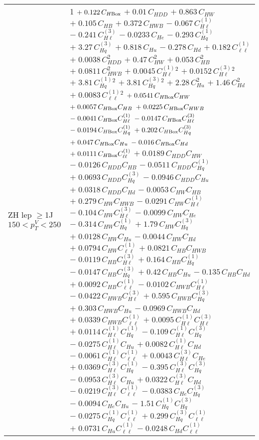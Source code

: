 \begin{tabular}{l|p{}}
    ZH lep $\geq$1J $150 < p_{T}^{V} < 250$ & 1 $+\;0.122\,C_{H\rm{Box}}$ $+\;0.01\,C_{HDD}$ $+\;0.863\,C_{HW}$ $+\;0.105\,C_{HB}$ $+\;0.372\,C_{HWB}$ $-\;0.067\,C^{(1)}_{H\ell}$ $-\;0.241\,C^{(3)}_{H\ell}$ $-\;0.0233\,C_{He}$ $-\;0.293\,C^{(1)}_{Hq}$ $+\;3.27\,C^{(3)}_{Hq}$ $+\;0.818\,C_{Hu}$ $-\;0.278\,C_{Hd}$ $+\;0.182\,C^{(1)}_{\ell\ell}$ $+\;0.0038\,C_{HDD}^{2}$ $+\;0.47\,C_{HW}^{2}$ $+\;0.053\,C_{HB}^{2}$ $+\;0.0811\,C_{HWB}^{2}$ $+\;0.0045\,C^{(1)}_{H\ell}^{2}$ $+\;0.0152\,C^{(3)}_{H\ell}^{2}$ $+\;3.81\,C^{(1)}_{Hq}^{2}$ $+\;3.81\,C^{(3)}_{Hq}^{2}$ $+\;2.28\,C_{Hu}^{2}$ $+\;1.46\,C_{Hd}^{2}$ $+\;0.0083\,C^{(1)}_{\ell\ell}^{2}$ $+\;0.0541\,C_{H\rm{Box}}C_{HW}$ $+\;0.0057\,C_{H\rm{Box}}C_{HB}$ $+\;0.0225\,C_{H\rm{Box}}C_{HWB}$ $-\;0.0041\,C_{H\rm{Box}}C^{(1)}_{H\ell}$ $-\;0.0147\,C_{H\rm{Box}}C^{(3)}_{H\ell}$ $-\;0.0194\,C_{H\rm{Box}}C^{(1)}_{Hq}$ $+\;0.202\,C_{H\rm{Box}}C^{(3)}_{Hq}$ $+\;0.047\,C_{H\rm{Box}}C_{Hu}$ $-\;0.016\,C_{H\rm{Box}}C_{Hd}$ $+\;0.0111\,C_{H\rm{Box}}C^{(1)}_{\ell\ell}$ $+\;0.0189\,C_{HDD}C_{HW}$ $-\;0.0126\,C_{HDD}C_{HB}$ $-\;0.0511\,C_{HDD}C^{(1)}_{Hq}$ $+\;0.0693\,C_{HDD}C^{(3)}_{Hq}$ $-\;0.0946\,C_{HDD}C_{Hu}$ $+\;0.0318\,C_{HDD}C_{Hd}$ $-\;0.0053\,C_{HW}C_{HB}$ $+\;0.279\,C_{HW}C_{HWB}$ $-\;0.0291\,C_{HW}C^{(1)}_{H\ell}$ $-\;0.104\,C_{HW}C^{(3)}_{H\ell}$ $-\;0.0099\,C_{HW}C_{He}$ $-\;0.314\,C_{HW}C^{(1)}_{Hq}$ $+\;1.79\,C_{HW}C^{(3)}_{Hq}$ $+\;0.0128\,C_{HW}C_{Hu}$ $-\;0.0044\,C_{HW}C_{Hd}$ $+\;0.0794\,C_{HW}C^{(1)}_{\ell\ell}$ $+\;0.0821\,C_{HB}C_{HWB}$ $-\;0.0119\,C_{HB}C^{(3)}_{H\ell}$ $+\;0.164\,C_{HB}C^{(1)}_{Hq}$ $-\;0.0147\,C_{HB}C^{(3)}_{Hq}$ $+\;0.42\,C_{HB}C_{Hu}$ $-\;0.135\,C_{HB}C_{Hd}$ $+\;0.0092\,C_{HB}C^{(1)}_{\ell\ell}$ $-\;0.0102\,C_{HWB}C^{(1)}_{H\ell}$ $-\;0.0422\,C_{HWB}C^{(3)}_{H\ell}$ $+\;0.595\,C_{HWB}C^{(3)}_{Hq}$ $+\;0.303\,C_{HWB}C_{Hu}$ $-\;0.0969\,C_{HWB}C_{Hd}$ $+\;0.0339\,C_{HWB}C^{(1)}_{\ell\ell}$ $+\;0.0095\,C^{(1)}_{H\ell}C^{(3)}_{H\ell}$ $+\;0.0114\,C^{(1)}_{H\ell}C^{(1)}_{Hq}$ $-\;0.109\,C^{(1)}_{H\ell}C^{(3)}_{Hq}$ $-\;0.0275\,C^{(1)}_{H\ell}C_{Hu}$ $+\;0.0082\,C^{(1)}_{H\ell}C_{Hd}$ $-\;0.0061\,C^{(1)}_{H\ell}C^{(1)}_{\ell\ell}$ $+\;0.0043\,C^{(3)}_{H\ell}C_{He}$ $+\;0.0369\,C^{(3)}_{H\ell}C^{(1)}_{Hq}$ $-\;0.395\,C^{(3)}_{H\ell}C^{(3)}_{Hq}$ $-\;0.0953\,C^{(3)}_{H\ell}C_{Hu}$ $+\;0.0322\,C^{(3)}_{H\ell}C_{Hd}$ $-\;0.0219\,C^{(3)}_{H\ell}C^{(1)}_{\ell\ell}$ $-\;0.0383\,C_{He}C^{(3)}_{Hq}$ $-\;0.0094\,C_{He}C_{Hu}$ $-\;1.51\,C^{(1)}_{Hq}C^{(3)}_{Hq}$ $-\;0.0275\,C^{(1)}_{Hq}C^{(1)}_{\ell\ell}$ $+\;0.299\,C^{(3)}_{Hq}C^{(1)}_{\ell\ell}$ $+\;0.0731\,C_{Hu}C^{(1)}_{\ell\ell}$ $-\;0.0248\,C_{Hd}C^{(1)}_{\ell\ell}$ \\

\end{tabular}
